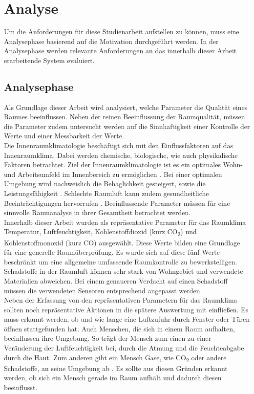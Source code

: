 \chapter{Analyse} 
Um die Anforderungen für diese Studienarbeit aufstellen zu können, muss eine Analysephase basierend auf die Motivation durchgeführt werden. In der Analysephase werden relevante Anforderungen an das innerhalb dieser Arbeit erarbeitende System evaluiert.
\section{Analysephase} \label{sec:Anforderungen}
Als Grundlage dieser Arbeit wird analysiert, welche Parameter die Qualität eines Raumes beeinflussen. Neben der reinen Beeinflussung der Raumqualität, müssen die Parameter zudem untersucht werden auf die Sinnhaftigkeit einer Kontrolle der Werte und einer Messbarkeit der Werte.\\
Die Innenraumklimatologie beschäftigt sich mit den Einflussfaktoren auf das Innenraumklima. Dabei werden chemische, biologische, wie auch physikalische Faktoren betrachtet. Ziel der Innenraumklimatologie ist es ein optimales Wohn- und Arbeitsumfeld im Innenbereich zu ermöglichen \cite{raumluft:Innenraumklimatologie}. Bei einer optimalen Umgebung wird nachweislich die Behaglichkeit gesteigert, sowie die Leistungsfähigkeit \cite{Raumklimatechnik}. Schlechte Raumluft kann zudem gesundheitliche Beeinträchtigungen hervorrufen \cite{raumluft:InnenluftqualitaetundGesundheit}. Beeinflussende Parameter müssen für eine sinnvolle Raumanalyse in ihrer Gesamtheit betrachtet werden.\\
Innerhalb dieser Arbeit wurden als repräsentative Parameter für das Raumklima Temperatur, Luftfeuchtigkeit, Kohlenstoffdioxid (kurz CO\textsubscript{2}) und Kohlenstoffmonoxid (kurz CO) ausgewählt. Diese Werte bilden eine Grundlage für eine generelle Raumüberprüfung. Es wurde sich auf diese fünf Werte beschränkt um eine allgemeine umfassende Raumkontrolle zu bewerkstelligen. Schadstoffe in der Raumluft können sehr stark von Wohngebiet und verwendete Materialien abweichen. Bei einem genaueren Verdacht auf einen Schadstoff müssen die verwendeten Sensoren entsprechend angepasst werden.\\
Neben der Erfassung von den repräsentativen Parametern für das Raumklima sollten noch repräsentative Aktionen in die spätere Auswertung mit einfließen. Es muss erkannt werden, ob und wie lange eine Luftzufuhr durch Fenster oder Türen öffnen stattgefunden hat. Auch Menschen, die sich in einem Raum aufhalten, beeinflussen ihre Umgebung. So trägt der Mensch zum einen zu einer Veränderung der Luftfeuchtigkeit bei, durch die Atmung und die Feuchteabgabe durch die Haut. Zum anderen gibt ein Mensch Gase, wie CO\textsubscript{2} oder andere Schadstoffe, an seine Umgebung ab \cite{raumluft:Luftmengen}. Es sollte aus diesen Gründen erkannt werden, ob sich ein Mensch gerade im Raum aufhält und dadurch diesen beeinflusst.\\
